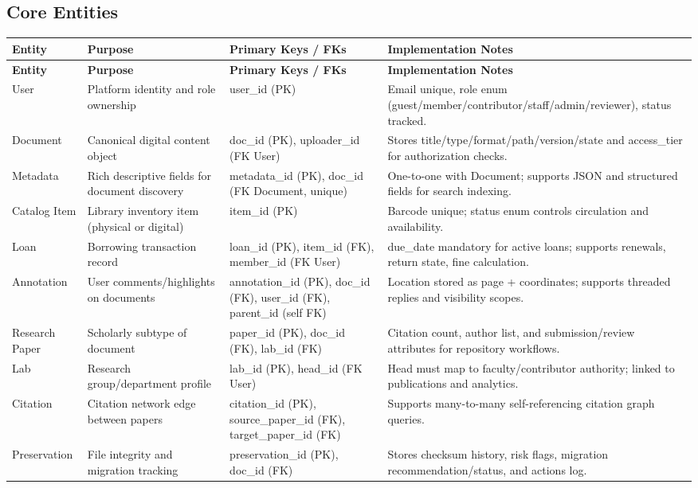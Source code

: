 \documentclass[12pt,a4paper]{article}
\begin{document}
\subsection*{Core Entities}
\renewcommand{\arraystretch}{1.16}
\small
\begin{longtable}{>{\raggedright\arraybackslash}p{2.2cm} >{\raggedright\arraybackslash}p{3.4cm} >{\raggedright\arraybackslash}p{4.0cm} >{\raggedright\arraybackslash}p{4.4cm}}
    \toprule
    \textbf{Entity} & \textbf{Purpose} & \textbf{Primary Keys / FKs} & \textbf{Implementation Notes} \\
    \midrule
    \endfirsthead
    \toprule
    \textbf{Entity} & \textbf{Purpose} & \textbf{Primary Keys / FKs} & \textbf{Implementation Notes} \\
    \midrule
    \endhead
    User & Platform identity and role ownership & user\_id (PK) & Email unique, role enum (guest/member/contributor/staff/admin/reviewer), status tracked. \\
    Document & Canonical digital content object & doc\_id (PK), uploader\_id (FK User) & Stores title/type/format/path/version/state and access\_tier for authorization checks. \\
    Metadata & Rich descriptive fields for document discovery & metadata\_id (PK), doc\_id (FK Document, unique) & One-to-one with Document; supports JSON and structured fields for search indexing. \\
    Catalog Item & Library inventory item (physical or digital) & item\_id (PK) & Barcode unique; status enum controls circulation and availability. \\
    Loan & Borrowing transaction record & loan\_id (PK), item\_id (FK), member\_id (FK User) & due\_date mandatory for active loans; supports renewals, return state, fine calculation. \\
    Annotation & User comments/highlights on documents & annotation\_id (PK), doc\_id (FK), user\_id (FK), parent\_id (self FK) & Location stored as page + coordinates; supports threaded replies and visibility scopes. \\
    Research Paper & Scholarly subtype of document & paper\_id (PK), doc\_id (FK), lab\_id (FK) & Citation count, author list, and submission/review attributes for repository workflows. \\
    Lab & Research group/department profile & lab\_id (PK), head\_id (FK User) & Head must map to faculty/contributor authority; linked to publications and analytics. \\
    Citation & Citation network edge between papers & citation\_id (PK), source\_paper\_id (FK), target\_paper\_id (FK) & Supports many-to-many self-referencing citation graph queries. \\
    Preservation & File integrity and migration tracking & preservation\_id (PK), doc\_id (FK) & Stores checksum history, risk flags, migration recommendation/status, and actions log. \\
    \bottomrule
\end{longtable}
\normalsize
\end{document}
